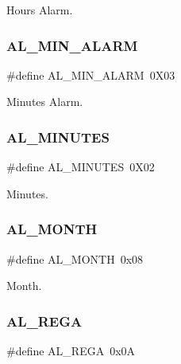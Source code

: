 Hours Alarm. 

\hypertarget{group___serial_ga9b3e0bfebdc40a726066400d65dce101}{}\label{group___serial_ga9b3e0bfebdc40a726066400d65dce101} 
\subsubsection{\texorpdfstring{A\+L\+\_\+\+M\+I\+N\+\_\+\+A\+L\+A\+RM}{AL\_MIN\_ALARM}}
{\footnotesize\ttfamily \#define A\+L\+\_\+\+M\+I\+N\+\_\+\+A\+L\+A\+RM~0\+X03}



Minutes Alarm. 

\hypertarget{group___serial_ga71c9c535bfcb21a9523f93f849253e57}{}\label{group___serial_ga71c9c535bfcb21a9523f93f849253e57} 
\subsubsection{\texorpdfstring{A\+L\+\_\+\+M\+I\+N\+U\+T\+ES}{AL\_MINUTES}}
{\footnotesize\ttfamily \#define A\+L\+\_\+\+M\+I\+N\+U\+T\+ES~0\+X02}



Minutes. 

\hypertarget{group___serial_gaf660f603c1c09d1bf76a4367ddba440b}{}\label{group___serial_gaf660f603c1c09d1bf76a4367ddba440b} 
\subsubsection{\texorpdfstring{A\+L\+\_\+\+M\+O\+N\+TH}{AL\_MONTH}}
{\footnotesize\ttfamily \#define A\+L\+\_\+\+M\+O\+N\+TH~0x08}



Month. 

\hypertarget{group___serial_ga8c4718b100d35ffbc2b5a753e4a700ab}{}\label{group___serial_ga8c4718b100d35ffbc2b5a753e4a700ab} 
\subsubsection{\texorpdfstring{A\+L\+\_\+\+R\+E\+GA}{AL\_REGA}}
{\footnotesize\ttfamily \#define A\+L\+\_\+\+R\+E\+GA~0x0A}



